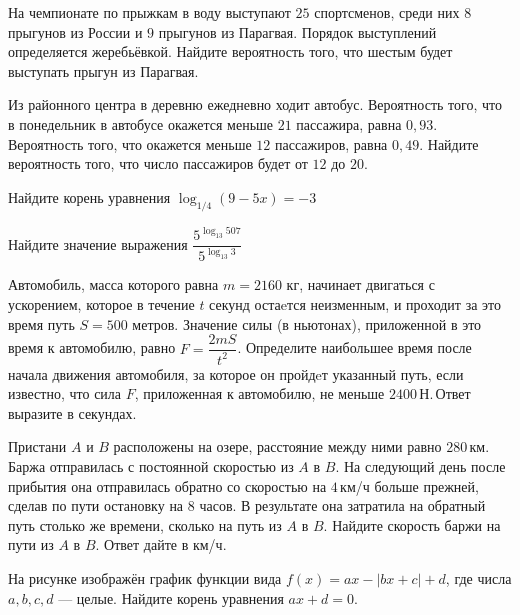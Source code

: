 	\begin{exam}
		\begin{listofex}
			\item На чемпионате по прыжкам в воду выступают \( 25 \) спортсменов, среди них \( 8 \) прыгунов из России и \( 9 \) прыгунов из Парагвая. Порядок выступлений определяется жеребьёвкой. Найдите вероятность того, что шестым будет выступать прыгун из Парагвая.
			\item Из районного центра в деревню ежедневно ходит автобус. Вероятность того, что в понедельник в автобусе окажется меньше \( 21 \) пассажира, равна \( 0,93 \). Вероятность того, что окажется меньше \( 12 \) пассажиров, равна \( 0,49 \). Найдите вероятность того, что число пассажиров будет от \( 12 \) до \( 20 \).
			\item Найдите корень уравнения \( \log_{1/4}(9-5x)=-3 \)
			\item Найдите значение выражения \( \dfrac{5^{\log_{13}507}}{5^{\log_{13}3}} \)
			\item Автомобиль, масса которого равна \( m=2160 \) кг, начинает двигаться с ускорением, которое в течение \( t \) секунд остаeтся неизменным, и проходит за это время путь \( S=500  \) метров. Значение силы (в ньютонах), приложенной в это время к автомобилю, равно \( F=\dfrac{2mS}{t^2}  \).  Определите наибольшее время после начала движения автомобиля, за которое он пройдeт указанный путь, если известно, что сила \( F \), приложенная к автомобилю, не меньше \( 2400 \) Н. Ответ выразите в секундах.
			\item Пристани \( A \) и \( B \) расположены на озере, расстояние между ними равно \( 280 \) км. Баржа отправилась с постоянной скоростью из \( A \) в \( B \). На следующий день после прибытия она отправилась обратно со скоростью на \( 4 \) км/ч больше прежней, сделав по пути остановку на \( 8 \) часов. В результате она затратила на обратный путь столько же времени, сколько на путь из \( A \) в \( B \). Найдите скорость баржи на пути из \( A \) в \( B \). Ответ дайте в км/ч.
			\item
			\begin{minipage}[t]{0.43\textwidth}
				На рисунке изображён график функции вида \(f(x)=ax-|bx+c|+d\), где числа \(a, b, c, d\) --- целые. Найдите корень уравнения \(ax+d=0\).
			\end{minipage}
			\begin{minipage}[c]{0.11\textwidth}

\end{minipage}
\end{listofex}
\end{exam}
